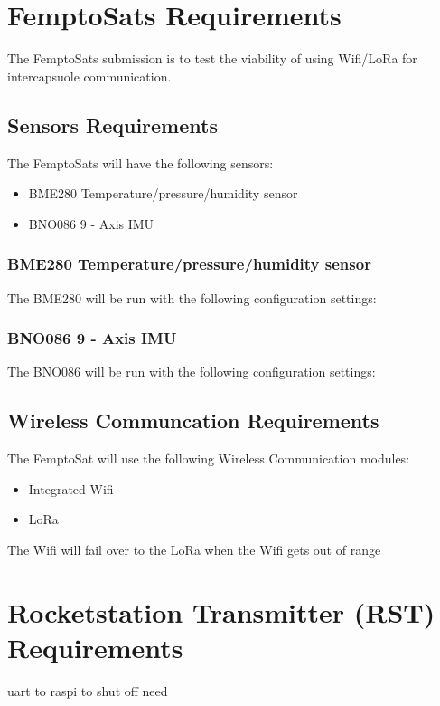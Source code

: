 \documentclass{book}
\begin{document}
\section{FemptoSats Requirements}
\par The FemptoSats submission is to test the viability of using Wifi/LoRa for intercapsuole communication. 

\subsection{Sensors Requirements}
\par The FemptoSats will have the following sensors: 
\begin{itemize}
    \item BME280 Temperature/pressure/humidity sensor
    \item BNO086 9 - Axis IMU
\end{itemize}

\subsubsection{BME280 Temperature/pressure/humidity sensor}
\par The BME280 will be run with the following configuration settings: 

\subsubsection{BNO086 9 - Axis IMU}
\par The BNO086 will be run with the following configuration settings:

\subsection{Wireless Communcation Requirements}
\par The FemptoSat will use the following Wireless Communication modules:
\begin{itemize}
    \item Integrated Wifi
    \item LoRa
\end{itemize}
\par The Wifi will fail over to the LoRa when the Wifi gets out of range

\section{Rocketstation Transmitter (RST) Requirements}
\par uart to raspi to shut off need
\end{document}
